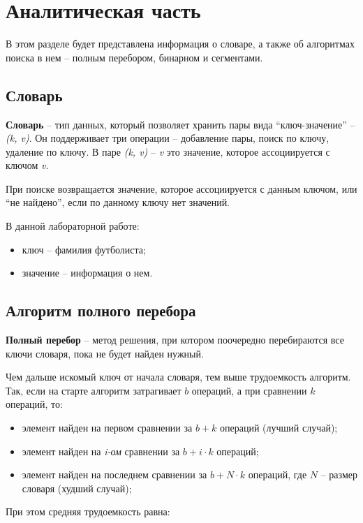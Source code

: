 \chapter{Аналитическая часть}
В этом разделе будет представлена информация о словаре, а также об алгоритмах поиска в нем -- полным перебором, бинарном и сегментами.


\section{Словарь}

\textbf{Словарь} \cite{dictionary} -- тип данных, который позволяет хранить пары вида “ключ-значение” -- \textit{(k, v)}. Он поддерживает три операции -- добавление пары, поиск по ключу, удаление по ключу. В паре \textit{(k, v)} -- \textit{v} это значение, которое ассоциируется с ключом \textit{v}.

При поиске возвращается значение, которое ассоциируется с данным ключом, или “не найдено”, если по данному ключу нет значений.

В данной лабораторной работе:
\begin{itemize}
	\item ключ -- фамилия футболиста;
	\item значение -- информация о нем.
\end{itemize}


\section{Алгоритм полного перебора}

\textbf{Полный перебор} \cite{search-full} -- метод решения, при котором поочередно перебираются все ключи словаря, пока не будет найден нужный.

Чем дальше искомый ключ от начала словаря, тем выше трудоемкость алгоритм. Так, если на старте алгоритм затрагивает $b$ операций, а при сравнении $k$ операций, то:
\begin{itemize}
	\item элемент найден на первом сравнении за $b + k$ операций (лучший случай);
	\item элемент найден на \textit{i-ом} сравнении за $b + i \cdot k$ операций;
	\item элемент найден на последнем сравнении за $b +  N \cdot k$ операций, где $N$ -- размер словаря (худший случай);
\end{itemize}

При этом средняя трудоемкость равна:

